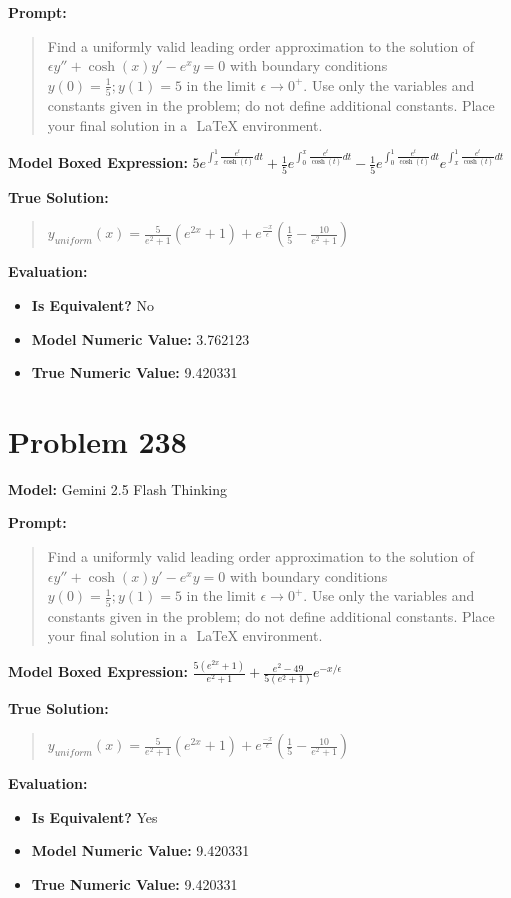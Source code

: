 \documentclass{article}
\begin{document}
{\textbf{Prompt:}
\begin{quote}
Find a uniformly valid leading order approximation to the solution of $\epsilon y'' + \cosh(x)y' - e^xy = 0$ with boundary conditions $y(0) = \frac{1}{5}; y(1) = 5$ in the limit $\epsilon \to 0^+$. Use only the variables and constants given in the problem; do not define additional constants. Place your final solution in a $\boxed{}$ LaTeX environment.
\end{quote}
\textbf{Model Boxed Expression:} $5e^{\int_x^1 \frac{e^t}{\cosh(t)} dt} + \frac{1}{5}e^{\int_0^x \frac{e^t}{\cosh(t)} dt} - \frac{1}{5}e^{\int_0^1 \frac{e^t}{\cosh(t)} dt}e^{\int_x^1 \frac{e^t}{\cosh(t)} dt}$

\textbf{True Solution:}
\begin{quote}
$y_{uniform}(x) = \frac{5}{e^2+1}(e^{2x} + 1) + e^{\frac{-x}{\epsilon}}(\frac{1}{5}-\frac{10}{e^2+1})$
\end{quote}

\textbf{Evaluation:}
\begin{itemize}
\item \textbf{Is Equivalent?} No
\item \textbf{Model Numeric Value:} 3.762123
\item \textbf{True Numeric Value:} 9.420331
\end{itemize}
\vspace{1cm}
\section*{Problem 238}
\textbf{Model:} Gemini 2.5 Flash Thinking

\textbf{Prompt:}
\begin{quote}
Find a uniformly valid leading order approximation to the solution of $\epsilon y'' + \cosh(x)y' - e^xy = 0$ with boundary conditions $y(0) = \frac{1}{5}; y(1) = 5$ in the limit $\epsilon \to 0^+$. Use only the variables and constants given in the problem; do not define additional constants. Place your final solution in a $\boxed{}$ LaTeX environment.
\end{quote}
\textbf{Model Boxed Expression:} $\frac{5(e^{2x}+1)}{e^2+1} + \frac{e^2-49}{5(e^2+1)}e^{-x/\epsilon}$

\textbf{True Solution:}
\begin{quote}
$y_{uniform}(x) = \frac{5}{e^2+1}(e^{2x} + 1) + e^{\frac{-x}{\epsilon}}(\frac{1}{5}-\frac{10}{e^2+1})$
\end{quote}

\textbf{Evaluation:}
\begin{itemize}
\item \textbf{Is Equivalent?} Yes
\item \textbf{Model Numeric Value:} 9.420331
\item \textbf{True Numeric Value:} 9.420331
\end{itemize}
\vspace{1cm}
}
\end{document}
